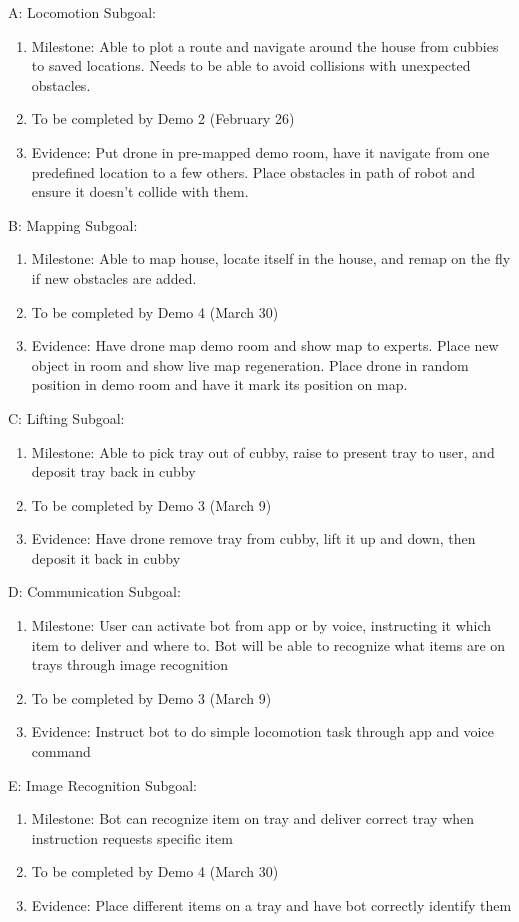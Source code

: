\documentclass{article}
\begin{document}
A: Locomotion Subgoal:
\begin{enumerate}
\item Milestone: Able to plot a route and navigate around the house from cubbies to saved locations. Needs to be able to avoid collisions with unexpected obstacles.
\item To be completed by Demo 2 (February 26)
\item Evidence: Put drone in pre-mapped demo room, have it navigate from one predefined location to a few others. Place obstacles in path of robot and ensure it doesn't collide with them.
\end{enumerate}
B: Mapping Subgoal:
\begin{enumerate}
\item Milestone: Able to map house, locate itself in the house, and remap on the fly if new obstacles are added.
\item To be completed by Demo 4 (March 30)
\item Evidence: Have drone map demo room and show map to experts. Place new object in room and show live map regeneration. Place drone in random position in demo room and have it mark its position on map.
\end{enumerate}
C: Lifting Subgoal:
\begin{enumerate}
\item Milestone: Able to pick tray out of cubby, raise to present tray to user, and deposit tray back in cubby
\item To be completed by Demo 3 (March 9)
\item Evidence: Have drone remove tray from cubby, lift it up and down, then deposit it back in cubby
\end{enumerate}
D: Communication Subgoal:
\begin{enumerate}
\item Milestone: User can activate bot from app or by voice, instructing it which item to deliver and where to. Bot will be able to recognize what items are on trays through image recognition
\item To be completed by Demo 3 (March 9)
\item Evidence: Instruct bot to do simple locomotion task through app and voice command
\end{enumerate}
E: Image Recognition Subgoal:
\begin{enumerate}
\item Milestone: Bot can recognize item on tray and deliver correct tray when instruction requests specific item
\item To be completed by Demo 4 (March 30)
\item Evidence: Place different items on a tray and have bot correctly identify them
\end{enumerate}
\end{document}
